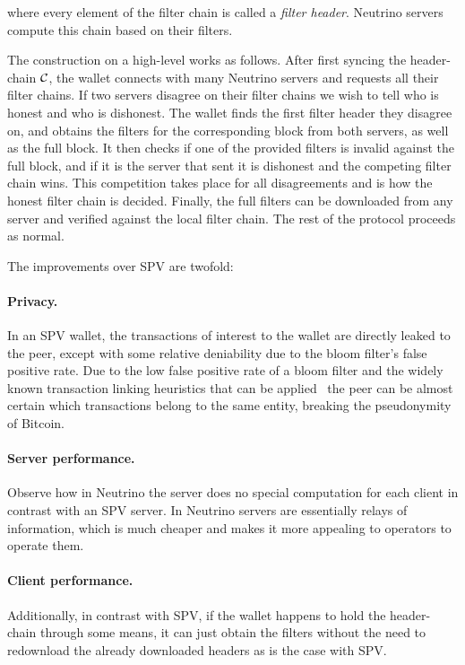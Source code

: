 where every element of the filter chain is called a \emph{filter header}. Neutrino servers compute this chain based on their filters.

The construction on a high-level works as follows. After first syncing the header-chain $\mathcal{C}$, the wallet connects with many Neutrino servers and requests all their filter chains. If two servers disagree on their filter chains we wish to tell who is honest and who is dishonest. The wallet finds the first filter header they disagree on, and obtains the filters for the corresponding block from both servers, as well as the full block. It then checks if one of the provided filters is invalid against the full block, and if it is the server that sent it is dishonest and the competing filter chain wins. This competition takes place for all disagreements and is how the honest filter chain is decided. Finally, the full filters can be downloaded from any server and verified against the local filter chain. The rest of the protocol proceeds as normal.



The improvements over SPV are twofold:
\paragraph{Privacy.} In an SPV wallet, the transactions of interest to the wallet are directly leaked to the peer, except with some relative deniability due to the bloom filter's false positive rate. Due to the low false positive rate of a bloom filter and the widely known transaction linking heuristics that can be applied~\cite{meiklejohn2013fistful,gervais2014privacy}
the peer can be almost certain which transactions belong to the same entity, breaking the pseudonymity of Bitcoin.
\paragraph{Server performance.} Observe how in Neutrino the server does no special computation for each client in contrast with an SPV server. In Neutrino servers are essentially relays of information, which is much cheaper and makes it more appealing to operators to operate them.
\paragraph{Client performance.} Additionally, in contrast with SPV, if the wallet happens to hold the header-chain through some means, it can just obtain the filters without the need to redownload the already downloaded headers as is the case with SPV.

